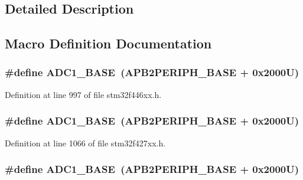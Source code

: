 \subsection{Detailed Description}


\subsection{Macro Definition Documentation}
\subsubsection[{\texorpdfstring{A\+D\+C1\+\_\+\+B\+A\+SE}{ADC1_BASE}}]{\setlength{\rightskip}{0pt plus 5cm}\#define A\+D\+C1\+\_\+\+B\+A\+SE~({\bf A\+P\+B2\+P\+E\+R\+I\+P\+H\+\_\+\+B\+A\+SE} + 0x2000\+U)}\hypertarget{group___peripheral__memory__map_ga695c9a2f892363a1c942405c8d351b91}{}\label{group___peripheral__memory__map_ga695c9a2f892363a1c942405c8d351b91}


Definition at line 997 of file stm32f446xx.\+h.

\subsubsection[{\texorpdfstring{A\+D\+C1\+\_\+\+B\+A\+SE}{ADC1_BASE}}]{\setlength{\rightskip}{0pt plus 5cm}\#define A\+D\+C1\+\_\+\+B\+A\+SE~({\bf A\+P\+B2\+P\+E\+R\+I\+P\+H\+\_\+\+B\+A\+SE} + 0x2000\+U)}\hypertarget{group___peripheral__memory__map_ga695c9a2f892363a1c942405c8d351b91}{}\label{group___peripheral__memory__map_ga695c9a2f892363a1c942405c8d351b91}


Definition at line 1066 of file stm32f427xx.\+h.

\subsubsection[{\texorpdfstring{A\+D\+C1\+\_\+\+B\+A\+SE}{ADC1_BASE}}]{\setlength{\rightskip}{0pt plus 5cm}\#define A\+D\+C1\+\_\+\+B\+A\+SE~({\bf A\+P\+B2\+P\+E\+R\+I\+P\+H\+\_\+\+B\+A\+SE} + 0x2000\+U)}\hypertarget{group___peripheral__memory__map_ga695c9a2f892363a1c942405c8d351b91}{}\label{group___peripheral__memory__map_ga695c9a2f892363a1c942405c8d351b91}


